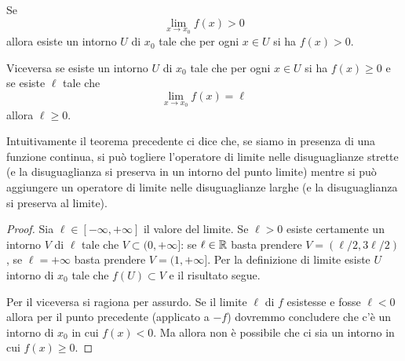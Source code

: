 \begin{theorem}%
  \label{th:permanenza_segno}%
\mymark{***}%
%
%
%
Se
\[
  \lim_{x\to x_0} f(x) > 0
\]
allora esiste un intorno $U$ di $x_0$ tale che 
per ogni $x\in U$ si ha $f(x) > 0$.

Viceversa se esiste un intorno $U$ di $x_0$ tale che per ogni $x \in U$  
si ha $f(x)\ge 0$ e se esiste $\ell$ tale che 
\[
    \lim_{x\to x_0} f(x) = \ell
\]
allora $\ell\ge 0$.
\end{theorem}
%
Intuitivamente il teorema precedente ci dice che, 
se siamo in presenza di una funzione continua,
si può togliere l'operatore di limite nelle disuguaglianze strette 
(e la disuguaglianza si preserva in un intorno del punto limite)
mentre si può aggiungere un operatore di limite nelle disuguaglianze larghe
(e la disuguaglianza si preserva al limite).
%
\begin{proof}
Sia $\ell\in [-\infty,+\infty]$ il valore del limite.
Se $\ell>0$ esiste certamente un intorno $V$ di $\ell$ 
tale che $V\subset (0,+\infty]$: se $\ell\in {\mathbb R}$ basta prendere 
$V=(\ell/2,3 \ell/2)$, se $\ell=+\infty$ basta prendere $V=(1,+\infty]$.
Per la definizione di limite esiste $U$ intorno di $x_0$ 
tale che $f(U)\subset V$ e il risultato segue.

Per il viceversa si ragiona per assurdo. 
Se il limite $\ell$ di $f$ esistesse e fosse $\ell < 0$
allora per il punto precedente (applicato a $-f$) dovremmo 
concludere che c'è un intorno di $x_0$ in cui $f(x)<0$.
Ma allora non è possibile che ci sia un intorno in cui $f(x)\ge 0$.
\end{proof}

